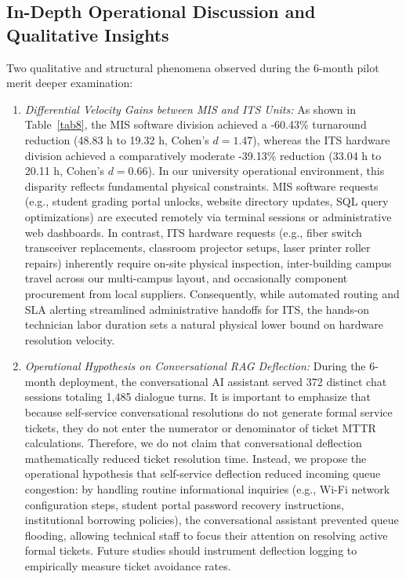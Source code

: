 \documentclass[conference]{IEEEtran}
\begin{document}
\subsection{In-Depth Operational Discussion and Qualitative Insights}
Two qualitative and structural phenomena observed during the 6-month pilot merit deeper examination:
\begin{enumerate}
    \item \textit{Differential Velocity Gains between MIS and ITS Units:} As shown in Table~\ref{tab8}, the MIS software division achieved a -60.43\% turnaround reduction (48.83 h to 19.32 h, Cohen's $d = 1.47$), whereas the ITS hardware division achieved a comparatively moderate -39.13\% reduction (33.04 h to 20.11 h, Cohen's $d = 0.66$). In our university operational environment, this disparity reflects fundamental physical constraints. MIS software requests (e.g., student grading portal unlocks, website directory updates, SQL query optimizations) are executed remotely via terminal sessions or administrative web dashboards. In contrast, ITS hardware requests (e.g., fiber switch transceiver replacements, classroom projector setups, laser printer roller repairs) inherently require on-site physical inspection, inter-building campus travel across our multi-campus layout, and occasionally component procurement from local suppliers. Consequently, while automated routing and SLA alerting streamlined administrative handoffs for ITS, the hands-on technician labor duration sets a natural physical lower bound on hardware resolution velocity.
    \item \textit{Operational Hypothesis on Conversational RAG Deflection:} During the 6-month deployment, the conversational AI assistant served 372 distinct chat sessions totaling 1,485 dialogue turns. It is important to emphasize that because self-service conversational resolutions do not generate formal service tickets, they do not enter the numerator or denominator of ticket MTTR calculations. Therefore, we do not claim that conversational deflection mathematically reduced ticket resolution time. Instead, we propose the operational hypothesis that self-service deflection reduced incoming queue congestion: by handling routine informational inquiries (e.g., Wi-Fi network configuration steps, student portal password recovery instructions, institutional borrowing policies), the conversational assistant prevented queue flooding, allowing technical staff to focus their attention on resolving active formal tickets. Future studies should instrument deflection logging to empirically measure ticket avoidance rates.
\end{enumerate}
\end{document}
